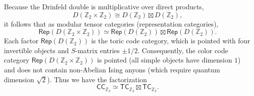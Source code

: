 \documentclass[a4paper,11pt]{article}
\newcommand{\Zbb}{\mathbb{Z}}
\theoremstyle{definition}
\theoremstyle{remark}
\theoremstyle{remark}
\newcommand\Rep {\mathsf{Rep}}
\begin{document}
Because the Drinfeld double is multiplicative over direct products,
\begin{equation*}
D(\mathbb{Z}_2 \times \mathbb{Z}_2) \cong D(\mathbb{Z}_2) \boxtimes D(\mathbb{Z}_2),
\end{equation*}
it follows that as modular tensor categories (representation categories),
\begin{equation*}
\Rep(D(\mathbb{Z}_2 \times \mathbb{Z}_2)) \simeq \Rep(D(\mathbb{Z}_2)) \boxtimes \Rep(D(\mathbb{Z}_2)).
\end{equation*}
Each factor $\Rep(D(\mathbb{Z}_2))$ is the toric code category, which is pointed with four invertible objects and $S$-matrix entries $\pm 1/2$. Consequently, the color code category $\Rep(D(\mathbb{Z}_2 \times \mathbb{Z}_2))$ is pointed (all simple objects have dimension $1$) and does not contain non-Abelian Ising anyons (which require quantum dimension $\sqrt{2}$). 
Thus we have the factorization 
\begin{equation*}
 \mathsf{CC}_{\Zbb_2}\simeq \mathsf{TC}_{\Zbb_2} \boxtimes  \mathsf{TC}_{\Zbb_2}.
\end{equation*}
\end{document}
